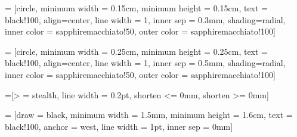  = [circle, 
					   minimum width = 0.15cm, 
					   minimum height = 0.15cm, 
					   text = black!100, 
					   align=center, 
					   line width = 1, 
					   inner sep = 0.3mm, 
					   shading=radial, 
					   inner color = sapphiremacchiato!50, 
					   outer color = sapphiremacchiato!100]

 = [circle, 
					   minimum width = 0.25cm, 
					   minimum height = 0.25cm, 
					   text = black!100, 
					   align=center, 
					   line width = 1, 
					   inner sep = 0.5mm, 
					   shading=radial, 
					   inner color = sapphiremacchiato!50, 
					   outer color = sapphiremacchiato!100]

=[> = stealth, line width = 0.2pt, shorten <= 0mm, shorten >= 0mm]


\newcommand{\slotheight}{1.6cm}
\newcommand{\slotwidth}{1.5mm}
\newcommand{\numchannels}{10}
\newcommand{\fsperchannel}{5}
\newcommand{\lw}{1pt}

 = [draw = black,
					minimum width = \slotwidth,
				    minimum height = \slotheight, 
					text = black!100,
					anchor = west,
					line width = \lw,
					inner sep = 0mm]

